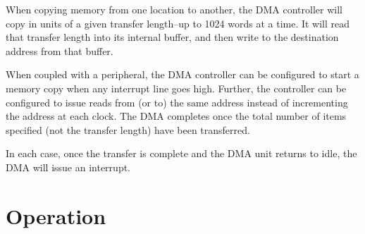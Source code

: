 \documentclass{gqtekspec}
\begin{document}
When copying memory from one location to another, the DMA controller will
copy in units of a given transfer length--up to 1024 words at a time.  It will
read that transfer length into its internal buffer, and then write to the
destination address from that buffer.

When coupled with a peripheral, the DMA controller can be configured to start
a memory copy when any interrupt line goes high.  Further, the controller can
be configured to issue reads from (or to) the same address instead of
incrementing the address at each clock.  The DMA completes once the total
number of items specified (not the transfer length) have been transferred.

In each case, once the transfer is complete and the DMA unit returns to
idle, the DMA will issue an interrupt.


\chapter{Operation}\label{chap:ops}
\end{document}
